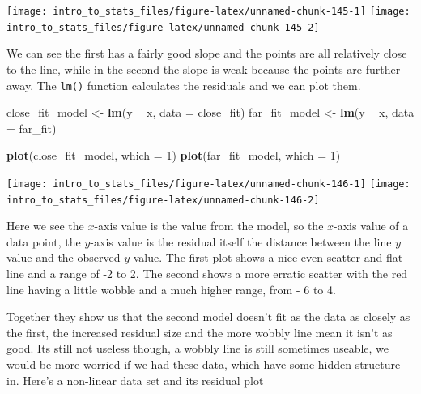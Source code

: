 \documentclass[
]{book}
\newenvironment{Shaded}{\begin{snugshade}}{\end{snugshade}}
\newcommand{\DataTypeTok}[1]{\textcolor[rgb]{0.13,0.29,0.53}{#1}}
\newcommand{\DecValTok}[1]{\textcolor[rgb]{0.00,0.00,0.81}{#1}}
\newcommand{\KeywordTok}[1]{\textcolor[rgb]{0.13,0.29,0.53}{\textbf{#1}}}
\newcommand{\NormalTok}[1]{#1}
\newcommand{\OperatorTok}[1]{\textcolor[rgb]{0.81,0.36,0.00}{\textbf{#1}}}
\newcommand{\StringTok}[1]{\textcolor[rgb]{0.31,0.60,0.02}{#1}}
\begin{document}
\texttt{[image: intro\_to\_stats\_files/figure-latex/unnamed-chunk-145-1]} \texttt{[image: intro\_to\_stats\_files/figure-latex/unnamed-chunk-145-2]}

We can see the first has a fairly good slope and the points are all relatively close to the line, while in the second the slope is weak because the points are further away. The \texttt{lm()} function calculates the residuals and we can plot them.

\begin{Shaded}
\begin{Highlighting}[]
\NormalTok{close_fit_model <-}\StringTok{ }\KeywordTok{lm}\NormalTok{(y }\OperatorTok{~}\StringTok{ }\NormalTok{x, }\DataTypeTok{data =}\NormalTok{ close_fit)}
\NormalTok{far_fit_model <-}\StringTok{ }\KeywordTok{lm}\NormalTok{(y }\OperatorTok{~}\StringTok{ }\NormalTok{x, }\DataTypeTok{data =}\NormalTok{ far_fit)}

\KeywordTok{plot}\NormalTok{(close_fit_model, }\DataTypeTok{which =} \DecValTok{1}\NormalTok{)}
\KeywordTok{plot}\NormalTok{(far_fit_model, }\DataTypeTok{which =} \DecValTok{1}\NormalTok{)}
\end{Highlighting}
\end{Shaded}

\texttt{[image: intro\_to\_stats\_files/figure-latex/unnamed-chunk-146-1]} \texttt{[image: intro\_to\_stats\_files/figure-latex/unnamed-chunk-146-2]}

Here we see the \(x\)-axis value is the value from the model, so the \(x\)-axis value of a data point, the \(y\)-axis value is the residual itself the distance between the line \(y\) value and the observed \(y\) value. The first plot shows a nice even scatter and flat line and a range of -2 to 2. The second shows a more erratic scatter with the red line having a little wobble and a much higher range, from - 6 to 4.

Together they show us that the second model doesn't fit as the data as closely as the first, the increased residual size and the more wobbly line mean it isn't as good. Its still not useless though, a wobbly line is still sometimes useable, we would be more worried if we had these data, which have some hidden structure in. Here's a non-linear data set and its residual plot
\end{document}
